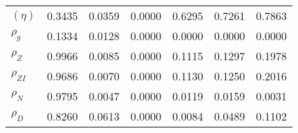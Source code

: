 \begin{center}
\begin{longtable}{lcccccc}
$ (\eta)              $	 & 	          0.3435	 & 	          0.0359	 & 	          0.0000	 & 	          0.6295	 & 	          0.7261	 & 	          0.7863 \\ 
$ {\rho_g}            $	 & 	          0.1334	 & 	          0.0128	 & 	          0.0000	 & 	          0.0000	 & 	          0.0000	 & 	          0.0000 \\ 
$ {\rho_Z}            $	 & 	          0.9966	 & 	          0.0085	 & 	          0.0000	 & 	          0.1115	 & 	          0.1297	 & 	          0.1978 \\ 
$ {\rho_{ZI}}         $	 & 	          0.9686	 & 	          0.0070	 & 	          0.0000	 & 	          0.1130	 & 	          0.1250	 & 	          0.2016 \\ 
$ {\rho_N}            $	 & 	          0.9795	 & 	          0.0047	 & 	          0.0000	 & 	          0.0119	 & 	          0.0159	 & 	          0.0031 \\ 
$ {\rho_D}            $	 & 	          0.8260	 & 	          0.0613	 & 	          0.0000	 & 	          0.0084	 & 	          0.0489	 & 	          0.1102 \\ 
\end{longtable}
 \end{center}
